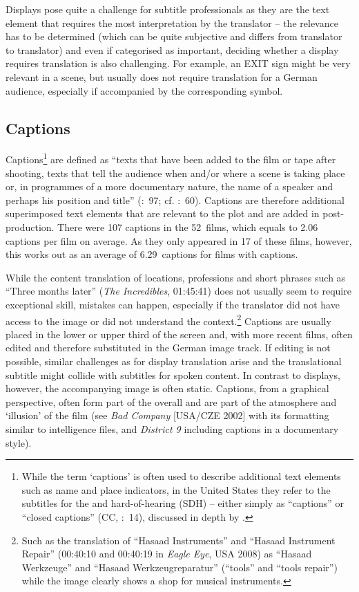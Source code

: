 Displays pose quite a challenge for subtitle professionals as they are the text element that requires the most interpretation by the translator – the relevance has to be determined (which can be quite subjective and differs from translator to translator) and even if categorised as important, deciding whether a display requires translation is also challenging. For example, an EXIT sign might be very relevant in a scene, but usually does not require translation for a German audience, especially if accompanied by the corresponding symbol.

\subsection{Captions}\label{sec:2.4.4}

Captions\footnote{While the term ‘captions’ is often used to describe additional text elements such as name and place indicators, in the United States they refer to the subtitles for the  and hard-of-hearing (SDH) – either simply as “captions” or “closed captions” (CC, \citealt{Diaz_cintas2007}:~14), discussed in depth by \citet{remael2007}.} are defined as “texts that have been added to the film or tape after shooting, texts that tell the audience when and/or where a scene is taking place or, in programmes of a more documentary nature, the name of a speaker and perhaps his position and title” (\citealt{Ivarsson1998}:~97; cf. \citealt{Diaz_cintas2007}:~60). Captions are therefore additional superimposed text elements that are relevant to the plot and are added in post-production. There were 107 captions in the 52~films, which equals to 2.06 captions per film on average. As they only appeared in 17 of these films, however, this works out as an average of 6.29~captions for films with captions.

While the content translation of  locations, professions and short phrases such as “Three months later” (\textit{The Incredibles}, 01:45:41) does not usually seem to require exceptional skill, mistakes can happen, especially if the translator did not have access to the image or did not understand the context.\footnote{Such as the  translation of “Hasaad Instruments” and “Hasaad Instrument Repair” (00:40:10 and 00:40:19 in \textit{Eagle Eye}, USA 2008) as “Hasaad Werkzeuge” and “Hasaad Werkzeugreparatur” (“tools” and “tools repair”) while the image clearly shows a shop for musical instruments.} Captions are usually placed in the lower or upper third of the screen and, with more recent films, often edited and therefore substituted in the German image track. If  editing is not possible, similar challenges as for display translation arise and the translational subtitle might collide with subtitles for spoken content. In contrast to displays, however, the accompanying image is often static. Captions, from a graphical perspective, often form part of the overall  and are part of the atmosphere and ‘illusion’ of the film (see \textit{Bad Company} [USA/CZE 2002] with its  formatting similar to intelligence files, and \textit{District 9} including captions in a documentary style).

